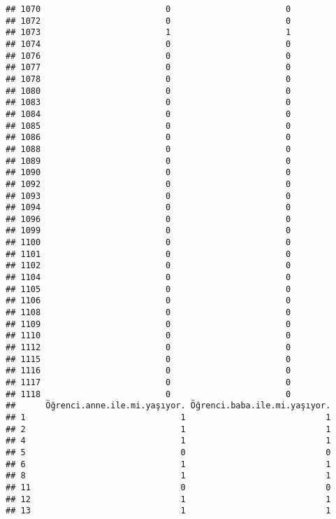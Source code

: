 \documentclass[
]{article}
\begin{document}
\begin{verbatim}
## 1070                         0                       0
## 1072                         0                       0
## 1073                         1                       1
## 1074                         0                       0
## 1076                         0                       0
## 1077                         0                       0
## 1078                         0                       0
## 1080                         0                       0
## 1083                         0                       0
## 1084                         0                       0
## 1085                         0                       0
## 1086                         0                       0
## 1088                         0                       0
## 1089                         0                       0
## 1090                         0                       0
## 1092                         0                       0
## 1093                         0                       0
## 1094                         0                       0
## 1096                         0                       0
## 1099                         0                       0
## 1100                         0                       0
## 1101                         0                       0
## 1102                         0                       0
## 1104                         0                       0
## 1105                         0                       0
## 1106                         0                       0
## 1108                         0                       0
## 1109                         0                       0
## 1110                         0                       0
## 1112                         0                       0
## 1115                         0                       0
## 1116                         0                       0
## 1117                         0                       0
## 1118                         0                       0
##      Öğrenci.anne.ile.mi.yaşıyor. Öğrenci.baba.ile.mi.yaşıyor.
## 1                               1                            1
## 2                               1                            1
## 4                               1                            1
## 5                               0                            0
## 6                               1                            1
## 8                               1                            1
## 11                              0                            0
## 12                              1                            1
## 13                              1                            1

\end{verbatim}
\end{document}
